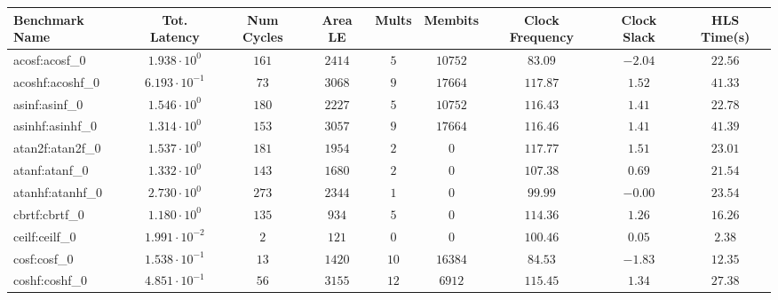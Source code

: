 \begin{tabular}{|l|c|c|c|c|c|c|c|c|}
\hline
Benchmark Name               & Tot. Latency            & Num Cycles & Area LE   & Mults   & Membits    & Clock Frequency & Clock Slack & HLS Time(s) \\
\hline
acosf:acosf\_0               & $ 1.938 \cdot 10^{0}  $ & $ 161    $ & $ 2414  $ & $ 5   $ & $ 10752  $ & $ 83.09       $ & $ -2.04   $ & $ 22.56   $ \\
acoshf:acoshf\_0             & $ 6.193 \cdot 10^{-1} $ & $ 73     $ & $ 3068  $ & $ 9   $ & $ 17664  $ & $ 117.87      $ & $ 1.52    $ & $ 41.33   $ \\
asinf:asinf\_0               & $ 1.546 \cdot 10^{0}  $ & $ 180    $ & $ 2227  $ & $ 5   $ & $ 10752  $ & $ 116.43      $ & $ 1.41    $ & $ 22.78   $ \\
asinhf:asinhf\_0             & $ 1.314 \cdot 10^{0}  $ & $ 153    $ & $ 3057  $ & $ 9   $ & $ 17664  $ & $ 116.46      $ & $ 1.41    $ & $ 41.39   $ \\
atan2f:atan2f\_0             & $ 1.537 \cdot 10^{0}  $ & $ 181    $ & $ 1954  $ & $ 2   $ & $ 0      $ & $ 117.77      $ & $ 1.51    $ & $ 23.01   $ \\
atanf:atanf\_0               & $ 1.332 \cdot 10^{0}  $ & $ 143    $ & $ 1680  $ & $ 2   $ & $ 0      $ & $ 107.38      $ & $ 0.69    $ & $ 21.54   $ \\
atanhf:atanhf\_0             & $ 2.730 \cdot 10^{0}  $ & $ 273    $ & $ 2344  $ & $ 1   $ & $ 0      $ & $ 99.99       $ & $ -0.00   $ & $ 23.54   $ \\
cbrtf:cbrtf\_0               & $ 1.180 \cdot 10^{0}  $ & $ 135    $ & $ 934   $ & $ 5   $ & $ 0      $ & $ 114.36      $ & $ 1.26    $ & $ 16.26   $ \\
ceilf:ceilf\_0               & $ 1.991 \cdot 10^{-2} $ & $ 2      $ & $ 121   $ & $ 0   $ & $ 0      $ & $ 100.46      $ & $ 0.05    $ & $ 2.38    $ \\
cosf:cosf\_0                 & $ 1.538 \cdot 10^{-1} $ & $ 13     $ & $ 1420  $ & $ 10  $ & $ 16384  $ & $ 84.53       $ & $ -1.83   $ & $ 12.35   $ \\
coshf:coshf\_0               & $ 4.851 \cdot 10^{-1} $ & $ 56     $ & $ 3155  $ & $ 12  $ & $ 6912   $ & $ 115.45      $ & $ 1.34    $ & $ 27.38   $ \\

\end{tabular}
